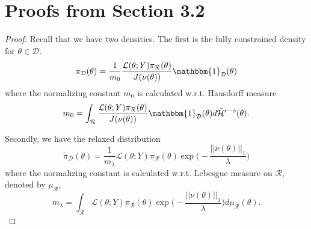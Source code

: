 \documentclass[10pt,fleqn]{article} \pdfoutput=1
\newcommand{\bb}[1]{\mathbb{#1}} \newcommand{\mc}[1]{\mathcal{#1}}
\DeclareMathOperator{\1}{\mathbbm{1}} \DeclareMathOperator{\bigO}{\mc O}
\begin{document}
\section{Proofs from Section 3.2}

\begin{proof}
Recall that we have two densities. The first is the fully constrained density for $\theta\in\mathcal{D}$.
\begin{equation*}
\pi_\mathcal{D}(\theta) = \frac{1}{m_0} \frac{\mathcal{L}(\theta;Y)\pi_\mathcal{R}(\theta)}{J(\nu(\theta))}\mathbbm{1}_\mathcal{D}(\theta)
\end{equation*}
where the normalizing constant $m_0$ is calculated w.r.t. Hausdorff measure
$$m_0 = \int_\mathcal{R} \frac{\mathcal{L}(\theta;Y)\pi_\mathcal{R}(\theta)}{J(\nu(\theta))}\mathbbm{1}_\mathcal{D}(\theta)d\bar{\mathcal{H}}^{r-s}(\theta).$$

Secondly, we have the relaxed distribution
$$\tilde{\pi}_\mathcal{D}(\theta) = \frac{1}{m_\lambda} \mathcal{L}(\theta;Y)\pi_\mathcal{R}(\theta)\exp\bigg(-\frac{||\nu(\theta)||_1}{\lambda}\bigg)$$
where the normalizing constant is calculated w.r.t. Lebesgue measure on $\mathcal{R}$, denoted by $\mu_\mathcal{R}$,
$$m_\lambda = \int_\mathcal{R}\mathcal{L}(\theta;Y)\pi_\mathcal{R}(\theta)\exp\bigg(-\frac{||\nu(\theta)||_1}{\lambda}\bigg) d\mu_\mathcal{R}(\theta).$$




\end{proof}
\end{document}
